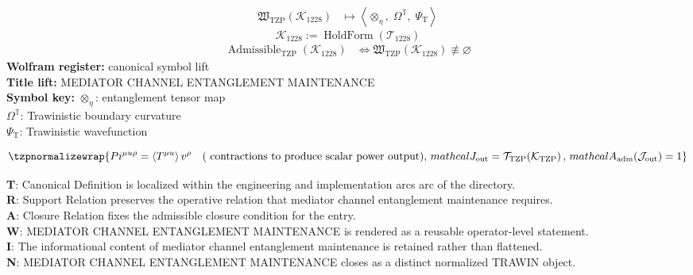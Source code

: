 \noindent
\begin{minipage}[t]{0.48\linewidth}
\begingroup
\small
\[
\begin{aligned}
\mathfrak{W}_{\mathrm{TZP}}\!\left(\mathcal{K}_{1228}\right)
&\longmapsto
\left\langle \otimes_{\eta},\; \Omega^{\mathbb{T}},\; \Psi_{\mathrm{T}} \right\rangle
\end{aligned}
\]
\[
\mathcal{K}_{1228}
:=
\operatorname{HoldForm}\!\left(\mathcal{T}_{1228}\right)
\]
\[
\begin{aligned}
\operatorname{Admissible}_{\mathrm{TZP}}\!\left(\mathcal{K}_{1228}\right)
&\Longleftrightarrow
\mathfrak{W}_{\mathrm{TZP}}\!\left(\mathcal{K}_{1228}\right)\not\equiv\varnothing
\end{aligned}
\]
\textbf{Wolfram register:} canonical symbol lift\\
\textbf{Title lift:} MEDIATOR CHANNEL ENTANGLEMENT MAINTENANCE\\
\textbf{Symbol key:} \(\otimes_{\eta}\): entanglement tensor map\\ \(\Omega^{\mathbb{T}}\): Trawinistic boundary curvature\\ \(\Psi_{\mathrm{T}}\): Trawinistic wavefunction
\par
\endgroup
\end{minipage}\hfill
\begin{minipage}[t]{0.48\linewidth}
\[
\tzpnormalizewrap{Pi^{\mu u\rho} = \langle T^{\mu u}\rangle\, v^\rho\quad\text{( contractions to produce scalar power output)},\,mathcal{J}_{\mathrm{out}} = \mathcal{T}_{\mathrm{TZP}}\!\left(\mathcal{K}_{\mathrm{TZP}}\right),\,mathcal{A}_{\mathrm{adm}}\!\left(\mathcal{J}_{\mathrm{out}}\right)=1}
\]

\small
\textbf{T}: Canonical Definition is localized within the engineering and implementation arcs arc of the directory.\\
\textbf{R}: Support Relation preserves the operative relation that mediator channel entanglement maintenance requires.\\
\textbf{A}: Closure Relation fixes the admissible closure condition for the entry.\\
\textbf{W}: MEDIATOR CHANNEL ENTANGLEMENT MAINTENANCE is rendered as a reusable operator-level statement.\\
\textbf{I}: The informational content of mediator channel entanglement maintenance is retained rather than flattened.\\
\textbf{N}: MEDIATOR CHANNEL ENTANGLEMENT MAINTENANCE closes as a distinct normalized TRAWIN object.
\normalsize
\end{minipage}

